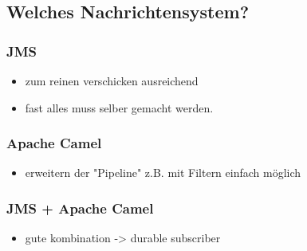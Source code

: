 
\subsection{Welches Nachrichtensystem?} %
\label{sub:welches_nachrichtensystem}

\subsubsection{JMS} %
\label{ssub:analyse_jms}
\begin{itemize}
    \item zum reinen verschicken ausreichend
    \item fast alles muss selber gemacht werden.
\end{itemize}
    
\subsubsection{Apache Camel} %
\label{ssub:analyse_apache_camel}
    \begin{itemize}
        \item erweitern der "Pipeline" z.B. mit Filtern einfach möglich
    \end{itemize}

\subsubsection{JMS + Apache Camel} %
\label{ssub:analyse_jms_apache_camel}

\begin{itemize}
    \item gute kombination -> durable subscriber
\end{itemize}






